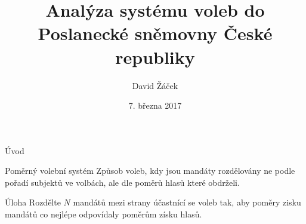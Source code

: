 \documentclass[17pt]{beamer}
\author{David Žáček}
\title[Volby do PSP ČR]{\small Analýza systému voleb do Poslanecké sněmovny České republiky}
\institute{8.M}
\date{7. března 2017}
\begin{document}
\begin{frame}
\titlepage
\end{frame}


\begin{frame}{Úvod}
\center
\begin{block}{Poměrný volební systém}
Způsob voleb, kdy jsou mandáty rozdělovány ne podle pořadí subjektů ve volbách, ale dle poměrů hlasů které obdrželi.
\end{block}
\begin{block}{Úloha}
Rozdělte $N$ mandátů mezi strany účastnící se voleb tak, aby poměry zisku mandátů co nejlépe odpovídaly poměrům získu hlasů.
\end{block}
\begin{center}
\end{center}
\end{frame}

\end{document}
